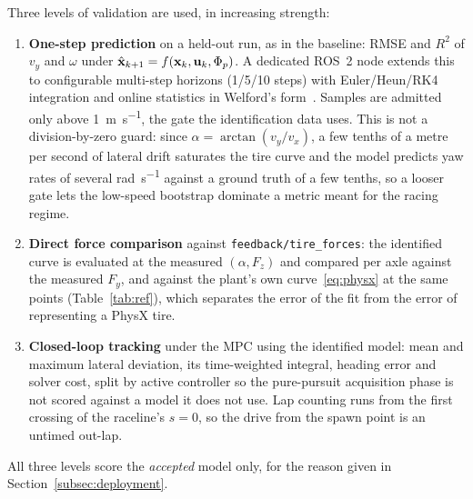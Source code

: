 Three levels of validation are used, in increasing strength:
\begin{enumerate}
\item \textbf{One-step prediction} on a held-out run, as in the baseline: RMSE
and $R^{2}$ of $v_{y}$ and $\omega$ under
$\hat{\mathbf{x}}_{k+1}=f(\mathbf{x}_{k},\mathbf{u}_{k},\Phi_{p})$. A dedicated ROS~2 node extends
this to configurable multi-step horizons (1/5/10 steps) with Euler/Heun/RK4
integration and online statistics in Welford's form~\cite{welford1962}.
Samples are admitted only above \SI{1}{\meter\per\second}, the gate the
identification data uses. This is not a division-by-zero guard: since
$\alpha=\arctan(v_{y}/v_{x})$, a few tenths of a metre per second of lateral
drift saturates the tire curve and the model predicts yaw rates of several
\si{\radian\per\second} against a ground truth of a few tenths, so a looser
gate lets the low-speed bootstrap dominate a metric meant for the racing
regime.
\item \textbf{Direct force comparison} against
\texttt{feedback/\allowbreak tire\_forces}: the identified curve is evaluated at
the measured $(\alpha,F_{z})$ and compared per axle against the measured
$F_{y}$, and against the plant's own curve~\eqref{eq:physx} at the same points
(Table~\ref{tab:ref}), which separates the error of the fit from the error of
representing a PhysX tire.
\item \textbf{Closed-loop tracking} under the MPC using the identified model:
mean and maximum lateral deviation, its time-weighted integral, heading error
and solver cost, split by active controller so the pure-pursuit acquisition
phase is not scored against a model it does not use. Lap counting runs from the
first crossing of the raceline's $s=0$, so the drive from the spawn point is an
untimed out-lap.
\end{enumerate}

All three levels score the \emph{accepted} model only, for the reason given in
Section~\ref{subsec:deployment}.
